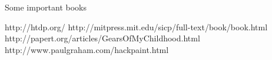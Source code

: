 \begin{rubric}{Some important books} 
\end{rubric}

\begin{center}
                      {http://htdp.org/}
                      {http://mitpress.mit.edu/sicp/full-text/book/book.html}
                      {http://papert.org/articles/GearsOfMyChildhood.html}
                      {http://www.paulgraham.com/hackpaint.html}

\end{center}
